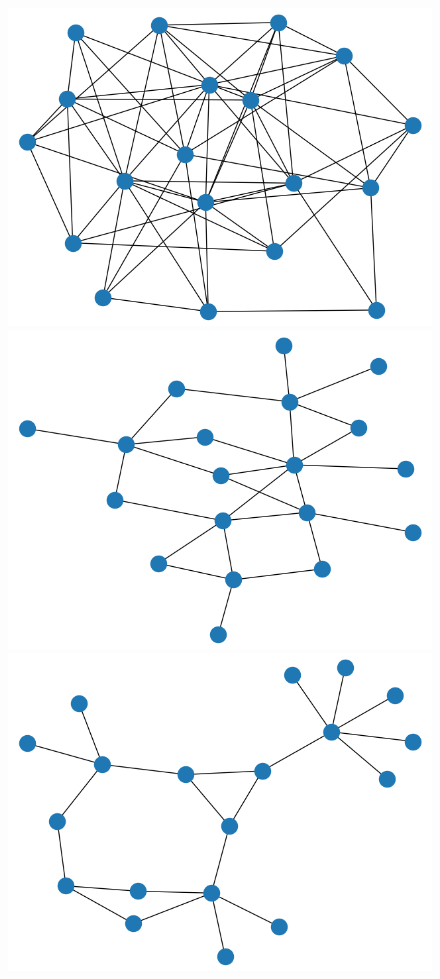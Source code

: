\documentclass[11pt,english]{article}
\theoremstyle{plain}
\theoremstyle{remark}
\begin{document}
\begin{figure}[hbt]
    \centering
   
    \includegraphics[scale=0.2]{timeline/state1.png}
    \includegraphics[scale=0.2]{timeline/state2.png}
    \includegraphics[scale=0.2]{timeline/state3.png}

\end{figure}
\end{document}
